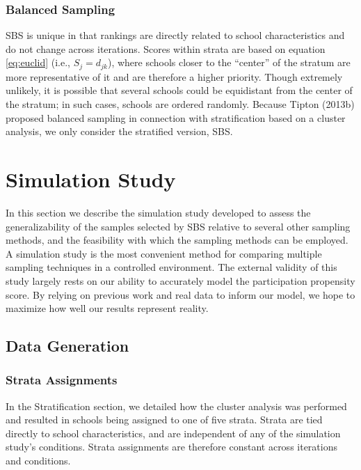 \documentclass[english,man,floatsintext]{apa6}
\begin{document}
\hypertarget{balanced-sampling-1}{%
\subsubsection{Balanced Sampling}\label{balanced-sampling-1}}

SBS is unique in that rankings are directly related to school characteristics and do not change across iterations. Scores within strata are based on equation \eqref{eq:euclid} (i.e., \(S_j = d_{jk}\)), where schools closer to the \enquote{center} of the stratum are more representative of it and are therefore a higher priority. Though extremely unlikely, it is possible that several schools could be equidistant from the center of the stratum; in such cases, schools are ordered randomly. Because Tipton (2013b) proposed balanced sampling in connection with stratification based on a cluster analysis, we only consider the stratified version, SBS.

\hypertarget{simulation-study}{%
\section{Simulation Study}\label{simulation-study}}

In this section we describe the simulation study developed to assess the generalizability of the samples selected by SBS relative to several other sampling methods, and the feasibility with which the sampling methods can be employed. A simulation study is the most convenient method for comparing multiple sampling techniques in a controlled environment. The external validity of this study largely rests on our ability to accurately model the participation propensity score. By relying on previous work and real data to inform our model, we hope to maximize how well our results represent reality.

\hypertarget{data-generation}{%
\subsection{Data Generation}\label{data-generation}}

\hypertarget{strata-assignments}{%
\subsubsection{Strata Assignments}\label{strata-assignments}}

In the Stratification section, we detailed how the cluster analysis was performed and resulted in schools being assigned to one of five strata. Strata are tied directly to school characteristics, and are independent of any of the simulation study's conditions. Strata assignments are therefore constant across iterations and conditions.
\end{document}
